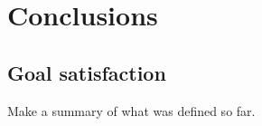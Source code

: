 \chapter{Conclusions} \label{chap:concl}

\section*{}



\section{Goal satisfaction}

Make a summary of what was defined so far.




